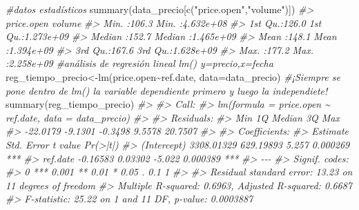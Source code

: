 \documentclass[
]{book}
\newenvironment{Shaded}{\begin{snugshade}}{\end{snugshade}}
\newcommand{\AttributeTok}[1]{\textcolor[rgb]{0.77,0.63,0.00}{#1}}
\newcommand{\CommentTok}[1]{\textcolor[rgb]{0.56,0.35,0.01}{\textit{#1}}}
\newcommand{\FunctionTok}[1]{\textcolor[rgb]{0.00,0.00,0.00}{#1}}
\newcommand{\NormalTok}[1]{#1}
\newcommand{\OtherTok}[1]{\textcolor[rgb]{0.56,0.35,0.01}{#1}}
\newcommand{\SpecialCharTok}[1]{\textcolor[rgb]{0.00,0.00,0.00}{#1}}
\newcommand{\StringTok}[1]{\textcolor[rgb]{0.31,0.60,0.02}{#1}}
\begin{document}
\begin{Shaded}
\begin{Highlighting}[]
\CommentTok{\#datos estadísticos}
\FunctionTok{summary}\NormalTok{(data\_precio[}\FunctionTok{c}\NormalTok{(}\StringTok{"price.open"}\NormalTok{,}\StringTok{"volume"}\NormalTok{)])}
\CommentTok{\#\textgreater{}    price.open        volume         }
\CommentTok{\#\textgreater{}  Min.   :106.3   Min.   :4.632e+08  }
\CommentTok{\#\textgreater{}  1st Qu.:126.0   1st Qu.:1.273e+09  }
\CommentTok{\#\textgreater{}  Median :152.7   Median :1.465e+09  }
\CommentTok{\#\textgreater{}  Mean   :148.1   Mean   :1.394e+09  }
\CommentTok{\#\textgreater{}  3rd Qu.:167.6   3rd Qu.:1.628e+09  }
\CommentTok{\#\textgreater{}  Max.   :177.2   Max.   :2.258e+09}
\CommentTok{\#análisis de regresión lineal lm() y=precio,x=fecha}
\NormalTok{reg\_tiempo\_precio}\OtherTok{\textless{}{-}}\FunctionTok{lm}\NormalTok{(price.open}\SpecialCharTok{\textasciitilde{}}\NormalTok{ref.date, }\AttributeTok{data=}\NormalTok{data\_precio) }
\CommentTok{\#¡Siempre se pone dentro de lm() la variable dependiente primero y luego la independiete!}
\FunctionTok{summary}\NormalTok{(reg\_tiempo\_precio)}
\CommentTok{\#\textgreater{} }
\CommentTok{\#\textgreater{} Call:}
\CommentTok{\#\textgreater{} lm(formula = price.open \textasciitilde{} ref.date, data = data\_precio)}
\CommentTok{\#\textgreater{} }
\CommentTok{\#\textgreater{} Residuals:}
\CommentTok{\#\textgreater{}      Min       1Q   Median       3Q      Max }
\CommentTok{\#\textgreater{} {-}22.0179  {-}9.1301  {-}0.3498   9.5578  20.7507 }
\CommentTok{\#\textgreater{} }
\CommentTok{\#\textgreater{} Coefficients:}
\CommentTok{\#\textgreater{}               Estimate Std. Error t value Pr(\textgreater{}|t|)    }
\CommentTok{\#\textgreater{} (Intercept) 3308.01329  629.19893   5.257 0.000269 ***}
\CommentTok{\#\textgreater{} ref.date      {-}0.16583    0.03302  {-}5.022 0.000389 ***}
\CommentTok{\#\textgreater{} {-}{-}{-}}
\CommentTok{\#\textgreater{} Signif. codes:  }
\CommentTok{\#\textgreater{} 0 \textquotesingle{}***\textquotesingle{} 0.001 \textquotesingle{}**\textquotesingle{} 0.01 \textquotesingle{}*\textquotesingle{} 0.05 \textquotesingle{}.\textquotesingle{} 0.1 \textquotesingle{} \textquotesingle{} 1}
\CommentTok{\#\textgreater{} }
\CommentTok{\#\textgreater{} Residual standard error: 13.23 on 11 degrees of freedom}
\CommentTok{\#\textgreater{} Multiple R{-}squared:  0.6963, Adjusted R{-}squared:  0.6687 }
\CommentTok{\#\textgreater{} F{-}statistic: 25.22 on 1 and 11 DF,  p{-}value: 0.0003887}


\end{Highlighting}
\end{Shaded}
\end{document}
